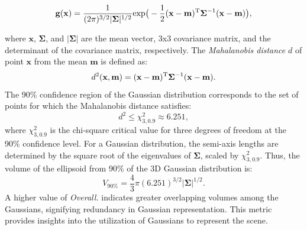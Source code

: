 \vspace{-4mm}
\begin{small}
\begin{equation}
    \mathbf{g}(\mathbf{x}) = \frac{1}{(2 \pi)^{3/2}|\mathbf{\Sigma}|^{1/2}}{\rm{exp}}\big(-\frac{1}{2}(\mathbf{x}-\mathbf{m})^{\rm T} \mathbf{\Sigma}^{-1} (\mathbf{x}-\mathbf{m})\big),
    \label{eq: gaussian_dist}
\end{equation}
\end{small}where $\mathbf{x}$, $\mathbf{\Sigma}$, and $|\mathbf{\Sigma}|$ are the mean vector, 3x3 covariance matrix, and the determinant of the covariance matrix, respectively.
The \textit{Mahalanobis distance} $d$ of point $\mathbf{x}$ from the mean $\mathbf{m}$ is defined as:
\begin{equation}
    d^2(\mathbf{x},\mathbf{m}) = (\mathbf{x}-\mathbf{m})^{\rm T} \mathbf{\Sigma}^{-1} (\mathbf{x}-\mathbf{m}).
    \label{eq: maha_dist}
\end{equation}
The 90\% confidence region of the Gaussian distribution corresponds to the set of points for which the Mahalanobis distance satisfies:
\begin{equation}
    d^2 \le \chi_{3,0.9}^2 \approx 6.251,
    \label{eq: chi2}
\end{equation}
where $\chi_{3,0.9}^2$ is the chi-square critical value for three degrees of freedom at the 90\% confidence level.
For a Gaussian distribution, the semi-axis lengths are determined by the square root of the eigenvalues of $\mathbf{\Sigma}$, scaled by $\chi_{3,0.9}^2$.
Thus, the volume of the ellipsoid from 90\% of the 3D Gaussian distribution is:
\begin{equation}
    V_{90\%} = \frac{4}{3}\pi (6.251)^{3/2} |\mathbf{\Sigma}|^{1/2}.
    \label{eq: V_2}
\end{equation}
A higher value of \textit{Overall.} indicates greater overlapping volumes among the Gaussians, signifying redundancy in Gaussian representation. 
This metric provides insights into the utilization of Gaussians to represent the scene.

